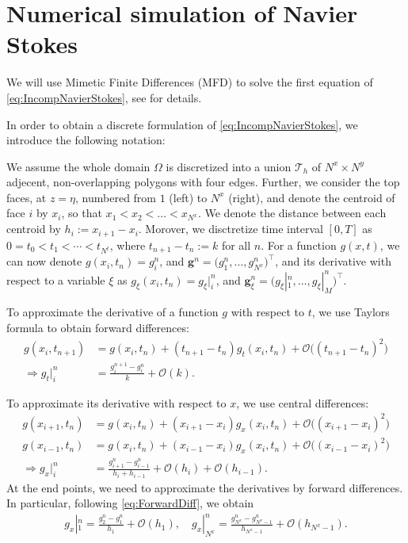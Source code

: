 \documentclass[12pt]{article}
\begin{document}
\section{Numerical simulation of Navier Stokes}
We will use Mimetic Finite Differences (MFD) to solve the first equation of \eqref{eq:IncompNavierStokes}, see \cite{somRef} for details.

In order to obtain a discrete formulation of \eqref{eq:IncompNavierStokes}, we introduce the following notation:

We assume the whole domain $\Omega$ is discretized into a union $\mathcal{T}_h$ of $N^x \times N^y$ adjecent, non-overlapping
polygons with four edges. Further, we consider the top faces, at $z = \eta$, numbered from $1$ (left) to $N^x$ (right), and denote
the centroid of face $i$ by $x_i$, so that $x_1 < x_2 < \dots < x_{N^x}$. We denote the distance between each centroid by
$h_i := x_{i+1}-x_i$. Morover, we disctretize time interval $[0, T]$ as $0 = t_0 < t_1 < \cdots < t_{N^t}$, where $t_{n+1}-t_n := k$ for all $n$.
For a function $g(x,t)$, we can now denote $g(x_i, t_n) = g_i^n$, and $\bm{g}^n = \Big(g_1^n, \dots, g_{N^x}^n\Big)^\top$, and its derivative with respect
to a variable $\xi$ as $g_\xi(x_i, t_n) = g_{\xi}|_i^n$, and $\bm{g}_\xi^n = \Big(g_{\xi}|_1^n, \dots, g_{\xi}|_M^n\Big)^\top$.

To approximate the derivative of a function $g$ with respect to $t$, we use Taylors formula to obtain forward differences:
\begin{align}
    \label{eq:ForwardDiff}
    g(x_i, t_{n+1})       & = g(x_i, t_n) +  (t_{n+1}-t_n)g_t(x_i, t_n) + \mathcal{O}\big((t_{n+1}-t_n)^2\big) \\
    \Rightarrow g_t|_i^n & = \frac{g_i^{n+1}-g_i^n}{k} + \mathcal{O}(k).
\end{align}

To approximate its derivative with respect to $x$, we use central differences:
\begin{align*}
    g(x_{i+1}, t_n)       & = g(x_i, t_n) +  (x_{i+1}-x_i)g_x(x_i, t_n) + \mathcal{O}\big((x_{i+1}-x_i)^2\big) \\
    g(x_{i-1}, t_n)       & = g(x_i, t_n) +  (x_{i-1}-x_i)g_x(x_i, t_n) + \mathcal{O}\big((x_{i-1}-x_i)^2\big) \\    
    \Rightarrow g_x|_i^n & = \frac{g_{i+1}^n-g_{i-1}^n}{h_i + h_{i-1}} + \mathcal{O}(h_i) + \mathcal{O}(h_{i-1}).
\end{align*}
At the end points, we need to approximate the derivatives by forward differences. In particular, following \eqref{eq:ForwardDiff}, 
we obtain
\begin{align*}
    g_x|_1^n = \frac{g_2^n -g_1^n}{h_1} + \mathcal{O}(h_1), \quad g_x|_{N^x}^n = \frac{g_{N^x}^n -g_{N^x-1}^n}{h_{N^x-1}} + \mathcal{O}(h_{N^x-1}).
\end{align*}
\end{document}
